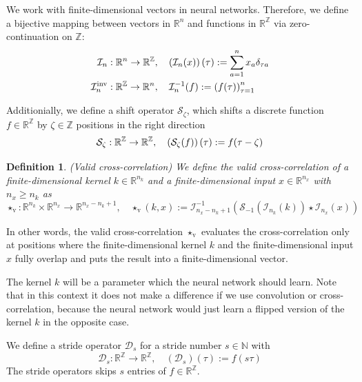 \documentclass[twoside,a4paper]{article}
\newtheorem{definition}{Definition}
\begin{document}
We work with finite-dimensional vectors in neural networks. Therefore, we define a bijective mapping between
vectors in $\mathbb{R}^n$ and functions in $\mathbb{R}^{\mathbb{Z}}$ 
via zero-continuation on $\mathbb{Z}$:
\begin{align*}
	\mathcal{I}_n &: \mathbb{R}^n \to \mathbb{R}^{\mathbb{Z}},
	\quad \left(\mathcal{I}_n(x)\right)(\tau) := \sum_{a=1}^{n} x_a \delta_{\tau a} \\
	\mathcal{I}_n^{\text{inv}} &: \mathbb{R}^{\mathbb{Z}} \to \mathbb{R}^n,
	\quad \mathcal{I}_n^{-1}(f) := \left( f(\tau) \right)_{\tau=1}^n
\end{align*}

Additionially, we define a shift operator $\mathcal{S}_\zeta$, 
which shifts a discrete function $f \in \mathbb{R}^\mathbb{Z}$ by $\zeta \in \mathbb{Z}$ positions
in the right direction
\begin{equation*}
	\mathcal{S}_\zeta : \mathbb{R}^{\mathbb{Z}} \to \mathbb{R}^{\mathbb{Z}},
	\quad \left( \mathcal{S}_\zeta(f) \right) (\tau) := f(\tau - \zeta)
\end{equation*}

\begin{definition}\label{def_cross_corr}
	(Valid cross-correlation)
	We define the valid cross-correlation of a finite-dimensional kernel $k \in \mathbb{R}^{n_k}$ and 
	a finite-dimensional input $x \in \mathbb{R}^{n_x}$ with $n_x \geq n_k$ as
	\begin{equation*}
		\star_{\text{v}} : \mathbb{R}^{n_k} \times \mathbb{R}^{n_x} \to \mathbb{R}^{n_x-n_k+1},
		\quad \star_{\text{v}}(k,x) := \mathcal{I}_{n_x-n_k+1}^{-1} (
			\mathcal{S}_{-1}( \mathcal{I}_{n_k}(k)) \star \mathcal{I}_{n_x}(x)
		)
	\end{equation*}
\end{definition}
In other words, the valid cross-correlation $\star_{\text{v}}$ evaluates the cross-correlation 
only at positions where the finite-dimensional kernel $k$ and the 
finite-dimensional input $x$ fully overlap and puts the result into a finite-dimensional vector.

The kernel $k$ will be a parameter which the neural network should learn.
Note that in this context it does not make a difference if we use convolution or cross-correlation, because
the neural network would just learn a flipped version of the kernel $k$ in the opposite case.

We define a stride operator $\mathcal{D}_s$ for a stride number $s \in \mathbb{N}$ with
\begin{equation*}
	\mathcal{D}_s : \mathbb{R}^{\mathbb{Z}} \to \mathbb{R}^{\mathbb{Z}},
	\quad (\mathcal{D}_s)(\tau) := f(s \tau)
\end{equation*}
The stride operators skips $s$ entries of $f \in \mathbb{R}^\mathbb{Z}$.
\end{document}
